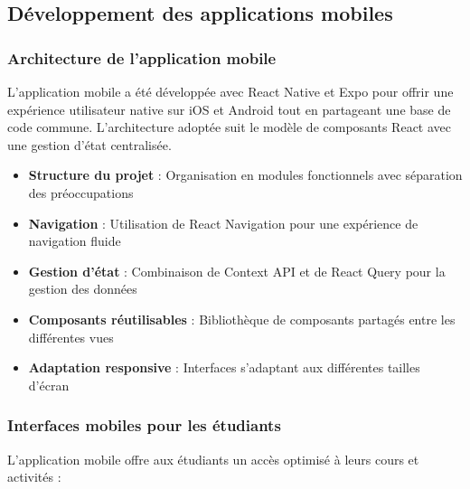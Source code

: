 \subsection{Développement des applications mobiles}

\subsubsection{Architecture de l'application mobile}

L'application mobile a été développée avec React Native et Expo pour offrir une expérience utilisateur native sur iOS et Android tout en partageant une base de code commune. L'architecture adoptée suit le modèle de composants React avec une gestion d'état centralisée.

\begin{itemize}
  \item \textbf{Structure du projet} : Organisation en modules fonctionnels avec séparation des préoccupations
  
  \item \textbf{Navigation} : Utilisation de React Navigation pour une expérience de navigation fluide
  
  \item \textbf{Gestion d'état} : Combinaison de Context API et de React Query pour la gestion des données
  
  \item \textbf{Composants réutilisables} : Bibliothèque de composants partagés entre les différentes vues
  
  \item \textbf{Adaptation responsive} : Interfaces s'adaptant aux différentes tailles d'écran
\end{itemize}

\subsubsection{Interfaces mobiles pour les étudiants}

L'application mobile offre aux étudiants un accès optimisé à leurs cours et activités :

